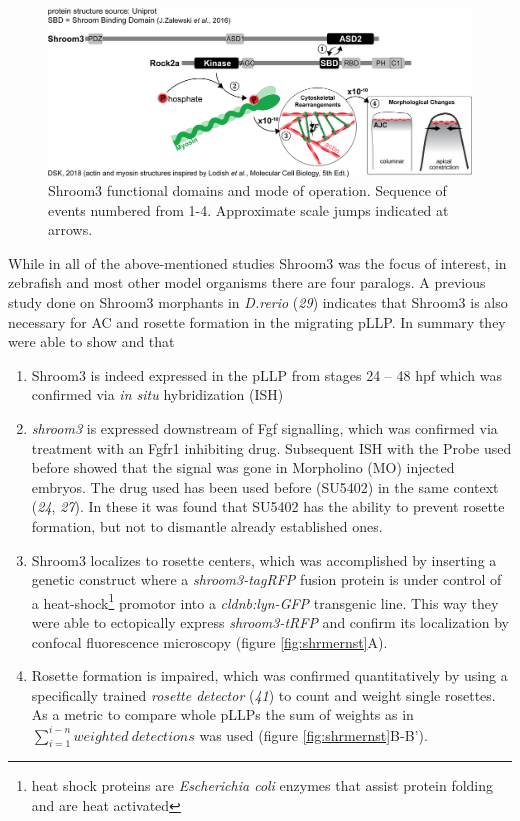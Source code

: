 \documentclass[11pt,singlespacinge,twoside]{reedthesis} %
\providecommand{\tightlist}{%
  \setlength{\itemsep}{0pt}\setlength{\parskip}{0pt}}
\begin{document}
\begin{figure}

{\centering \includegraphics[width=.95\textwidth]{figures/intro/shrm3_interaction} 

}

\caption[Shroom3 functional domains and mode of operation]{Shroom3 functional domains and mode of operation. Sequence of events numbered from 1-4. Approximate scale jumps indicated at arrows.}\label{fig:shrminteract}
\end{figure}
While in all of the above-mentioned studies Shroom3 was the focus of interest, in zebrafish and most other model organisms there are four paralogs. A previous study done on Shroom3 morphants in \emph{D.rerio} (\emph{29}) indicates that Shroom3 is also necessary for AC and rosette formation in the migrating pLLP. In summary they were able to show and that
\begin{enumerate}
\def\labelenumi{\arabic{enumi}.}
\tightlist
\item
  Shroom3 is indeed expressed in the pLLP from stages 24 -- 48 hpf which was confirmed via \emph{in situ} hybridization (ISH)
\item
  \emph{shroom3} is expressed downstream of Fgf signalling, which was confirmed via treatment with an Fgfr1 inhibiting drug. Subsequent ISH with the Probe used before showed that the signal was gone in Morpholino (MO) injected embryos. The drug used has been used before (SU5402) in the same context (\emph{24}, \emph{27}). In these it was found that SU5402 has the ability to prevent rosette formation, but not to dismantle already established ones.
\item
  Shroom3 localizes to rosette centers, which was accomplished by inserting a genetic construct where a \emph{shroom3-tagRFP} fusion protein is under control of a heat-shock\footnote{heat shock proteins are \emph{Escherichia coli} enzymes that assist protein folding and are heat activated} promotor into a \emph{cldnb:lyn-GFP} transgenic line. This way they were able to ectopically express \emph{shroom3-tRFP} and confirm its localization by confocal fluorescence microscopy (figure \ref{fig:shrmernst}A).
\item
  Rosette formation is impaired, which was confirmed quantitatively by using a specifically trained \emph{rosette detector} (\emph{41}) to count and weight single rosettes. As a metric to compare whole pLLPs the sum of weights as in \(\sum_{i=1}^{i-n}{weighted\ detections}\) was used (figure \ref{fig:shrmernst}B-B').
\end{enumerate}
\end{document}
